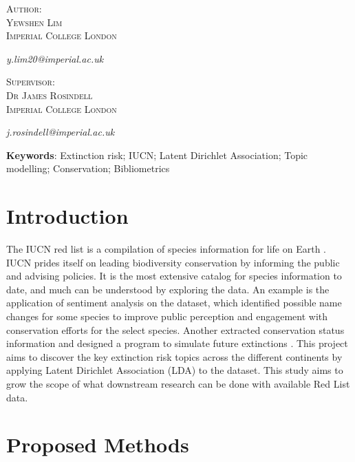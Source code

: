 \documentclass[11pt, a4paper, titlepage]{article}
\begin{document}
\begin{titlepage}
    \vspace{0.5\baselineskip} %

    {\scshape\Large
            Author: \\
            Yewshen Lim \\
            Imperial College London \\}

    \textit{y.lim20@imperial.ac.uk}

    {\scshape\Large        
            Supervisor: \\
            Dr James Rosindell \\
            Imperial College London\\} %

    \textit{j.rosindell@imperial.ac.uk}

\end{titlepage}

\noindent \textbf{Keywords}: Extinction risk; IUCN; Latent Dirichlet Association; Topic modelling; Conservation; Bibliometrics

\section{Introduction}

\noindent 
The IUCN red list is a compilation of species information for life on Earth \parencite{iucn2020}. IUCN prides itself on leading biodiversity conservation by informing the public and advising policies. It is the most extensive catalog for species information to date, and much can be understood by exploring the data. An example is the application of sentiment analysis \parencite{gregg2020many} on the dataset, which identified possible name changes for some species to improve public perception and engagement with conservation efforts for the select species. Another extracted conservation status information and designed a program to simulate future extinctions \parencite{andermann2020}. This project aims to discover the key extinction risk topics across the different continents by applying Latent Dirichlet Association (LDA) \parencite{blei2003latent} to the dataset. This study aims to grow the scope of what downstream research can be done with available Red List data.

\section{Proposed Methods}
\end{document}
